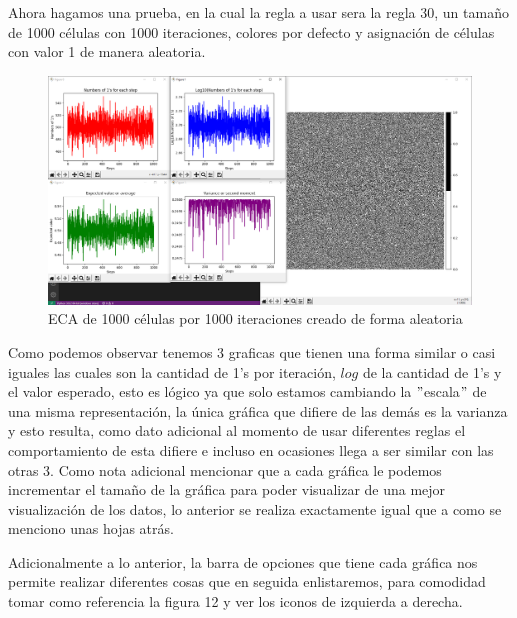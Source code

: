 \documentclass[11pt]{article}
\begin{document}
 		Ahora hagamos una prueba, en la cual la regla a usar sera la regla 30, un tamaño de 1000 células con 1000 iteraciones, colores por defecto y asignación de células con valor 1 de manera aleatoria.
 		\begin{figure}[H]
			\centering
			\includegraphics[scale=0.35]{resources/pruebaF1.png}
			\caption{ECA de 1000 células por 1000 iteraciones creado de forma aleatoria}\label{fig:picture}
		\end{figure}
		Como podemos observar tenemos 3 graficas que tienen una forma similar o casi iguales las cuales son la cantidad de 1's por iteración, $log$ de la cantidad de 1's y el valor esperado, esto es lógico ya que solo estamos cambiando la $"$escala$"$ de una misma representación, la única gráfica que difiere de las demás es la varianza y esto resulta, como dato adicional al momento de usar diferentes reglas el comportamiento de esta difiere e incluso en ocasiones llega a ser similar con las otras 3. Como nota adicional mencionar que a cada gráfica le podemos incrementar el tamaño de la gráfica para poder visualizar de una mejor visualización de los datos, lo anterior se realiza exactamente igual que a como se menciono unas hojas atrás.\par
		Adicionalmente a lo anterior, la barra de opciones que tiene cada gráfica nos permite realizar diferentes cosas que en seguida enlistaremos, para comodidad tomar como referencia la figura 12 y ver los iconos de izquierda a derecha.
\end{document}
